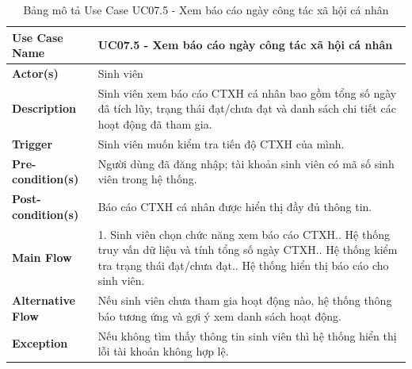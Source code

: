 \begin{table}[H]
	\centering
	\renewcommand{\arraystretch}{1.25}
	\begin{tabular}{|p{3.8cm}|p{11.2cm}|}
		\hline
		\textbf{Use Case Name} & \textbf{UC07.5 - Xem báo cáo ngày công tác xã hội cá nhân} \\ \hline
		\textbf{Actor(s)} & Sinh viên \\ \hline
		\textbf{Description} & Sinh viên xem báo cáo CTXH cá nhân bao gồm tổng số ngày đã tích lũy, trạng thái đạt/chưa đạt và danh sách chi tiết các hoạt động đã tham gia. \\ \hline
		\textbf{Trigger} & Sinh viên muốn kiểm tra tiến độ CTXH của mình. \\ \hline
		\textbf{Pre-condition(s)} & Người dùng đã đăng nhập; tài khoản sinh viên có mã số sinh viên trong hệ thống. \\ \hline
		\textbf{Post-condition(s)} & Báo cáo CTXH cá nhân được hiển thị đầy đủ thông tin. \\ \hline
		\textbf{Main Flow} & 1. Sinh viên chọn chức năng xem báo cáo CTXH.\newline
		2. Hệ thống truy vấn dữ liệu và tính tổng số ngày CTXH.\newline
		3. Hệ thống kiểm tra trạng thái đạt/chưa đạt.\newline
		4. Hệ thống hiển thị báo cáo cho sinh viên. \\ \hline
		\textbf{Alternative Flow} & Nếu sinh viên chưa tham gia hoạt động nào, hệ thống thông báo tương ứng và gợi ý xem danh sách hoạt động. \\ \hline
		\textbf{Exception} & Nếu không tìm thấy thông tin sinh viên thì hệ thống hiển thị lỗi tài khoản không hợp lệ. \\ \hline
	\end{tabular}
	\caption{Bảng mô tả Use Case UC07.5 - Xem báo cáo ngày công tác xã hội cá nhân}
\end{table}

